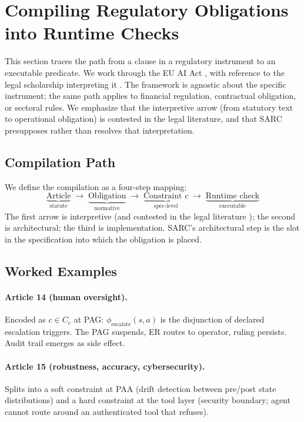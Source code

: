 \documentclass[11pt,a4paper]{article}
\theoremstyle{remark}
\begin{document}
\section{Compiling Regulatory Obligations into Runtime Checks}\label{sec:compile}

This section traces the path from a clause in a regulatory instrument to an executable predicate. We work through the EU AI Act \cite{eu2024aiact}, with reference to the legal scholarship interpreting it \cite{veale2021demystifying,smuha2021euapproach,malgieri2024aiact,laurent2024aiact,novelli2024riskmgmt}. The framework is agnostic about the specific instrument; the same path applies to financial regulation, contractual obligation, or sectoral rules. We emphasize that the interpretive arrow (from statutory text to operational obligation) is contested in the legal literature, and that SARC presupposes rather than resolves that interpretation.

\subsection{Compilation Path}

We define the compilation as a four-step mapping:
\[
    \underbrace{\text{Article}}_{\text{statute}} \;\longrightarrow\; \underbrace{\text{Obligation}}_{\text{normative}} \;\longrightarrow\; \underbrace{\text{Constraint } c}_{\text{spec-level}} \;\longrightarrow\; \underbrace{\text{Runtime check}}_{\text{executable}}
\]
The first arrow is interpretive (and contested in the legal literature \cite{veale2021demystifying}); the second is architectural; the third is implementation. SARC's architectural step is the slot in the specification into which the obligation is placed.

\subsection{Worked Examples}

\paragraph{Article 14 (human oversight).} Encoded as $c \in C_e$ at PAG: $\phi_{\text{escalate}}(s,a)$ is the disjunction of declared escalation triggers. The PAG suspends, ER routes to operator, ruling persists. Audit trail emerges as side effect.

\paragraph{Article 15 (robustness, accuracy, cybersecurity).} Splits into a soft constraint at PAA (drift detection between pre/post state distributions) and a hard constraint at the tool layer (security boundary; agent cannot route around an authenticated tool that refuses).
\end{document}
